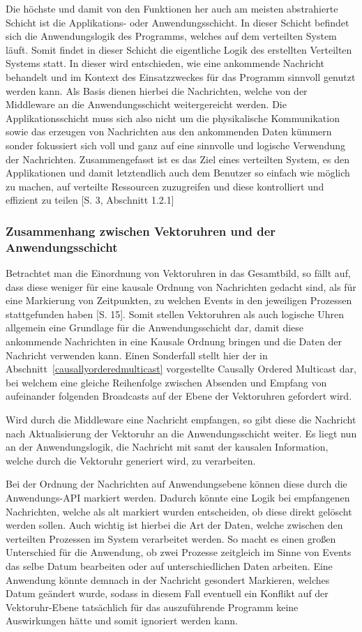  Die höchste und damit von den Funktionen her auch am meisten abstrahierte Schicht ist die Applikations- oder Anwendungsschicht. In dieser Schicht befindet sich die Anwendungslogik des Programms, welches auf dem verteilten System läuft. Somit findet in dieser Schicht die eigentliche Logik des erstellten Verteilten Systems statt. In dieser wird entschieden, wie eine ankommende Nachricht behandelt und im Kontext des Einsatzzweckes für das Programm sinnvoll genutzt werden kann. Als Basis dienen hierbei die Nachrichten, welche von der Middleware an die Anwendungsschicht weitergereicht werden. Die Applikationsschicht muss sich also nicht um die physikalische Kommunikation sowie das erzeugen von Nachrichten aus den ankommenden Daten kümmern sonder fokussiert sich voll und ganz auf eine sinnvolle und logische Verwendung der Nachrichten.
 Zusammengefasst ist es das Ziel eines verteilten System, es den Applikationen und damit letztendlich auch dem Benutzer so einfach wie möglich zu machen, auf verteilte Ressourcen zuzugreifen und diese kontrolliert und effizient zu teilen \cite{Tanenbaum2007}[S. 3, Abschnitt 1.2.1]

\subsubsection{Zusammenhang zwischen Vektoruhren und der Anwendungsschicht}
Betrachtet man die Einordnung von Vektoruhren in das Gesamtbild, so fällt auf, dass diese weniger für eine kausale Ordnung von Nachrichten gedacht sind, als für eine Markierung von Zeitpunkten, zu welchen Events in den jeweiligen Prozessen stattgefunden haben \cite{Baldoni:2002:FDC:1435723.1437765}[S. 15]. Somit stellen Vektoruhren als auch logische Uhren allgemein eine Grundlage für die Anwendungsschicht dar, damit diese ankommende Nachrichten in eine Kausale Ordnung bringen und die Daten der Nachricht verwenden kann. Einen Sonderfall stellt hier der in Abschnitt~\ref{causallyorderedmulticast} vorgestellte Causally Ordered Multicast dar, bei welchem eine gleiche Reihenfolge zwischen Absenden und Empfang von aufeinander folgenden Broadcasts auf der Ebene der Vektoruhren gefordert wird.

Wird durch die Middleware eine Nachricht empfangen, so gibt diese die Nachricht nach Aktualisierung der Vektoruhr an die Anwendungsschicht weiter. Es liegt nun an der Anwendungslogik, die Nachricht mit samt der kausalen Information, welche durch die Vektoruhr generiert wird, zu verarbeiten. 

Bei der Ordnung der Nachrichten auf Anwendungsebene können diese durch die Anwendungs-API markiert werden. Dadurch könnte eine Logik bei empfangenen Nachrichten, welche als alt markiert wurden entscheiden, ob diese direkt gelöscht werden sollen. Auch wichtig ist hierbei die Art der Daten, welche zwischen den verteilten Prozessen im System verarbeitet werden. So macht es einen großen Unterschied für die Anwendung, ob zwei Prozesse zeitgleich im Sinne von Events das selbe Datum bearbeiten oder auf unterschiedlichen Daten arbeiten. Eine Anwendung könnte demnach in der Nachricht gesondert Markieren, welches Datum geändert wurde, sodass in diesem Fall eventuell ein Konflikt auf der Vektoruhr-Ebene tatsächlich für das auszuführende Programm keine Auswirkungen hätte und somit ignoriert werden kann.